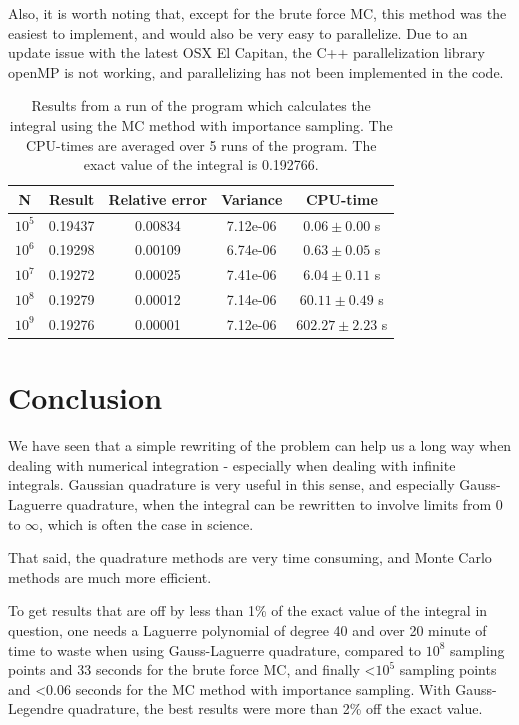 \documentclass[twoside, 11pt]{article}
\begin{document}
		Also, it is worth noting that, except for the brute force MC, this method was the easiest to implement, and would also be very easy to parallelize. Due to an update issue with the latest OSX El Capitan, the C++ parallelization library openMP is not working, and parallelizing has not been implemented in the code.
		\begin{table}[h]
			\centering
			\caption{Results from a run of the program which calculates the integral using the MC method with importance sampling. The CPU-times are averaged over 5 runs of the program. The exact value of the integral is 0.192766.}
			\label{table: results MC importance}
			\begin{tabular}{|c|c|c|c|c|}
\hline
\textbf{N} 		&	\textbf{Result}		&	\textbf{Relative error}	&	\textbf{Variance}	&	\textbf{CPU-time} \\ \hline
$10^5$ 	&	0.19437	&	0.00834	&	7.12e-06	&	$0.06 \pm 0.00$ s	\\ \hline 
$10^6$ 	&	0.19298	&	0.00109	&	6.74e-06	&	$0.63 \pm 0.05$ s	\\ \hline 
$10^7$ 	&	0.19272	&	0.00025	&	7.41e-06	&	$6.04 \pm 0.11$ s	\\ \hline 
$10^8$ 	&	0.19279	&	0.00012	&	7.14e-06	&	$60.11 \pm 0.49$ s	\\ \hline 
$10^9$ 	&	0.19276	&	0.00001	&	7.12e-06	&	$602.27 \pm 2.23$ s	\\ \hline 
			\end{tabular}
		\end{table}


\section{Conclusion}
	We have seen that a simple rewriting of the problem can help us a long way when dealing with numerical integration - especially when dealing with infinite integrals. Gaussian quadrature is very useful in this sense, and especially Gauss-Laguerre quadrature, when the integral can be rewritten to involve limits from 0 to $\infty$, which is often the case in science.
	
	That said, the quadrature methods are very time consuming, and Monte Carlo methods are much more efficient. 
	
	To get results that are off by less than 1\% of the exact value of the integral in question, one needs a Laguerre polynomial of degree 40 and over 20 minute of time to waste when using Gauss-Laguerre quadrature, compared to $10^8$ sampling points and 33 seconds for the brute force MC, and finally <$10^5$ sampling points and <0.06 seconds for the MC method with importance sampling. With Gauss-Legendre quadrature, the best results were more than 2\% off the exact value.
%
%


\end{document}
